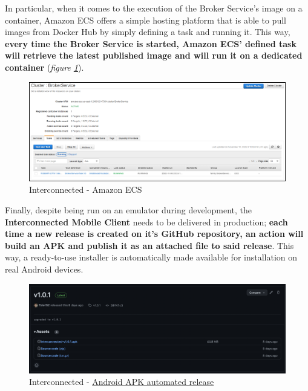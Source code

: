 In particular, when it comes to the execution of the Broker Service's image on a container, Amazon ECS offers a simple hosting platform that is able to pull images from Docker Hub by simply defining a task and running it. This way, \textbf{every time the Broker Service is started, Amazon ECS' defined task will retrieve the latest published image and will run it on a dedicated container} (\textit{figure \ref{fig:interconnected_ecs}}).

\begin{figure}[!ht]
    \centering
    \includegraphics[scale=0.37]{document/chapters/chapter_7/images/interconnected_ecs.png}
    \caption{Interconnected - Amazon ECS}
    \label{fig:interconnected_ecs}
\end{figure}

Finally, despite being run on an emulator during development, the \textbf{Interconnected Mobile Client} needs to be delivered in production; \textbf{each time a new release is created on it's GitHub repository, an action will build an APK and publish it as an attached file to said release}. This way, a ready-to-use installer is automatically made available for installation on real Android devices.

\begin{figure}[!ht]
    \centering
    \includegraphics[scale=0.3]{document/chapters/chapter_7/images/github_actions_apk.png}
    \caption{Interconnected - \href{https://github.com/Interconnected-project/interconnected_mobile_client/releases}{Android APK automated release}}
    \label{fig:github_actions_apk}
\end{figure}